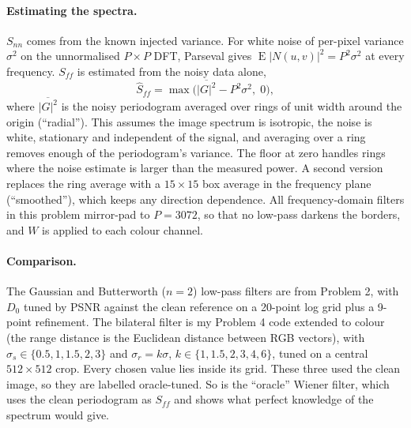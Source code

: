\paragraph{Estimating the spectra.} $S_{nn}$ comes from the known injected
variance. For white noise of per-pixel variance $\sigma^2$ on the unnormalised
$P\times P$ DFT, Parseval gives $\operatorname{E}|N(u,v)|^2=P^2\sigma^2$ at every
frequency. $S_{ff}$ is estimated from the noisy data alone,
\begin{equation}
\hat S_{ff}=\max\big(\overline{|G|^2}-P^2\sigma^2,\;0\big),
\end{equation}
where $\overline{|G|^2}$ is the noisy periodogram averaged over rings of unit
width around the origin (``radial''). This assumes the image spectrum is
isotropic, the noise is white, stationary and independent of the signal, and
averaging over a ring removes enough of the periodogram's variance. The floor at
zero handles rings where the noise estimate is larger than the measured power. A
second version replaces the ring average with a $15\times15$ box average in the
frequency plane (``smoothed''), which keeps any direction dependence. All
frequency-domain filters in this problem mirror-pad to $P=3072$, so that no
low-pass darkens the borders, and $W$ is applied to each colour channel.

\paragraph{Comparison.} The Gaussian and Butterworth ($n=2$) low-pass filters
are  from Problem 2, with $D_0$ tuned by PSNR against the
clean reference on a 20-point log grid plus a 9-point refinement. The bilateral
filter is my Problem 4 code extended to colour (the range distance is the
Euclidean distance between RGB vectors), with $\sigma_s\in\{0.5,1,1.5,2,3\}$ and
$\sigma_r=k\sigma$, $k\in\{1,1.5,2,3,4,6\}$, tuned on a central $512\times512$
crop. Every chosen value lies inside its grid. These three used the clean image,
so they are labelled oracle-tuned. So is the ``oracle'' Wiener filter, which
uses the clean periodogram as $S_{ff}$ and shows what perfect knowledge of the
spectrum would give.

